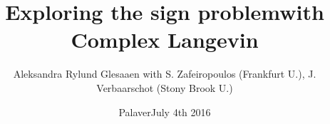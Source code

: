 



\title{Exploring the sign problem\newline{}with Complex Langevin}
\author{\texorpdfstring{%
    Aleksandra Rylund Glesaaen\newline{}%
    \fontsize{12pt}{12pt}\selectfont%
    with S. Zafeiropoulos (Frankfurt U.),\newline{}%
    \hphantom{with } J. Verbaarschot (Stony Brook U.)
  }{%
    Aleksandra Rylund Glesaaen}}
\date{\fontsize{16pt}{16pt}\selectfont{}Palaver\newline{}July 4th 2016}



\begin{frame}[plain]
\titlepage
\end{frame}

\begin{frame}[plain]
  \tableofcontents
\end{frame}

\setcounter{framenumber}{0}







